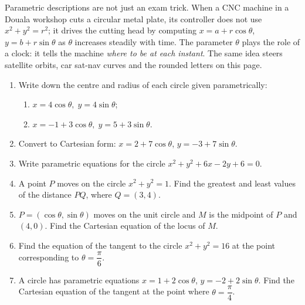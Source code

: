 \documentclass[11pt]{article}
\begin{document}
\begin{savaistu}
Parametric descriptions are not just an exam trick. When a CNC machine in a Douala workshop cuts a circular metal plate, its controller does not use $x^{2}+y^{2}=r^{2}$; it drives the cutting head by computing $x=a+r\cos\theta$, $y=b+r\sin\theta$ as $\theta$ increases steadily with time. The parameter $\theta$ plays the role of a clock: it tells the machine \emph{where to be at each instant}. The same idea steers satellite orbits, car sat-nav curves and the rounded letters on this page.
\end{savaistu}

\begin{exercice}[Practice]
\begin{enumerate}
\item Write down the centre and radius of each circle given parametrically:
\begin{enumerate}
\item $x=4\cos\theta,\;y=4\sin\theta$;
\item $x=-1+3\cos\theta,\;y=5+3\sin\theta$.
\end{enumerate}
\item Convert to Cartesian form: $x=2+7\cos\theta$, $y=-3+7\sin\theta$.
\item Write parametric equations for the circle $x^{2}+y^{2}+6x-2y+6=0$.
\item A point $P$ moves on the circle $x^{2}+y^{2}=1$. Find the greatest and least values of the distance $PQ$, where $Q=(3,4)$.
\item $P=(\cos\theta,\sin\theta)$ moves on the unit circle and $M$ is the midpoint of $P$ and $(4,0)$. Find the Cartesian equation of the locus of $M$.
\item Find the equation of the tangent to the circle $x^{2}+y^{2}=16$ at the point corresponding to $\theta=\dfrac{\pi}{6}$.
\item A circle has parametric equations $x=1+2\cos\theta$, $y=-2+2\sin\theta$. Find the Cartesian equation of the tangent at the point where $\theta=\dfrac{\pi}{4}$.
\end{enumerate}
\end{exercice}
\end{document}
